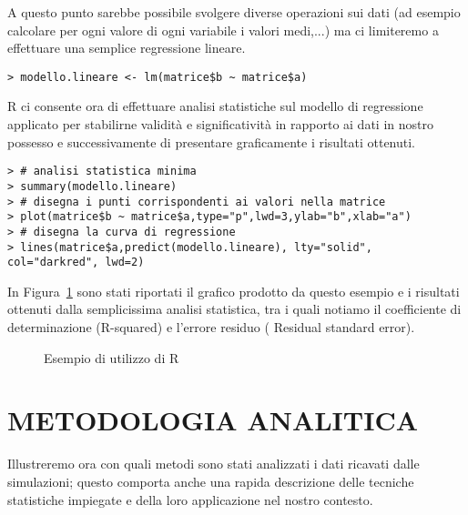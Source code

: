 \documentclass[12pt,a4paper,openright,twoside]{report}
\begin{document}
A questo punto sarebbe possibile svolgere diverse operazioni sui dati (ad esempio calcolare per ogni valore di ogni variabile i valori medi,...) ma ci limiteremo a effettuare una semplice regressione lineare.
\begin{lstlisting}
> modello.lineare <- lm(matrice$b ~ matrice$a)
\end{lstlisting}

R ci consente ora di effettuare analisi statistiche sul modello di regressione applicato per stabilirne validità e significatività in rapporto ai dati in nostro possesso e successivamente di presentare graficamente i risultati ottenuti.
\begin{lstlisting}
> # analisi statistica minima
> summary(modello.lineare)       
> # disegna i punti corrispondenti ai valori nella matrice
> plot(matrice$b ~ matrice$a,type="p",lwd=3,ylab="b",xlab="a")    
> # disegna la curva di regressione
> lines(matrice$a,predict(modello.lineare), lty="solid", col="darkred", lwd=2)    
\end{lstlisting}


In Figura~\ref{example_r} sono stati riportati il grafico prodotto da questo esempio e i risultati ottenuti dalla semplicissima analisi statistica, tra i quali notiamo il coefficiente di determinazione (R-squared) e l'errore residuo (
Residual standard error).

\begin{figure}[H]
	\centering
	\quad
	\caption{Esempio di utilizzo di R}
	\label{example_r}
\end{figure}


\section{METODOLOGIA ANALITICA}

Illustreremo ora con quali metodi sono stati analizzati i dati ricavati dalle simulazioni; questo comporta anche una rapida descrizione delle tecniche statistiche impiegate e della loro applicazione nel nostro contesto.
\end{document}
